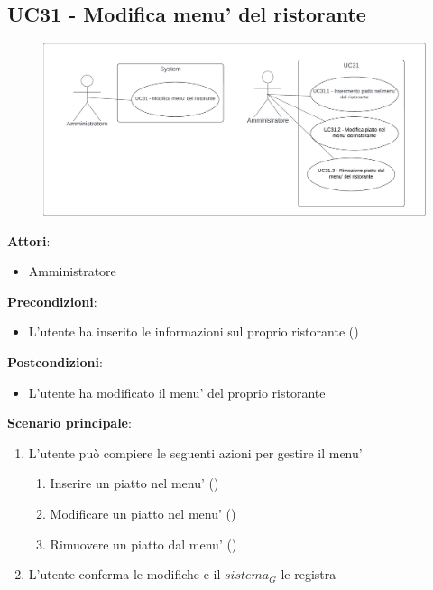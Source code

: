 \subsection{UC31 - Modifica menu' del ristorante}\label{usecase:31}
\begin{figure}[H]
    \centering
    \includegraphics[width=0.9\linewidth]{ucd/UCD31.png}
\end{figure}
\textbf{Attori}:
\begin{itemize}
    \item Amministratore
\end{itemize}
\textbf{Precondizioni}:
\begin{itemize}
    \item L'utente ha inserito le informazioni sul proprio ristorante ()
\end{itemize}
\textbf{Postcondizioni}:
\begin{itemize}
    \item L'utente ha modificato il menu' del proprio ristorante
\end{itemize}
\textbf{Scenario principale}:
\begin{enumerate}
    \item L'utente può compiere le seguenti azioni per gestire il menu'
    \begin{enumerate}
        \item Inserire un piatto nel menu' ()
        \item Modificare un piatto nel menu' ()
        \item Rimuovere un piatto dal menu' ()
    \end{enumerate}
    \item L'utente conferma le modifiche e il $\textit{sistema}_G$ le registra
\end{enumerate}